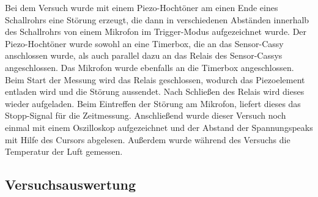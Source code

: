 \documentclass[12pt,a4paper]{article}
\begin{document}
Bei dem Versuch wurde mit einem Piezo-Hochtöner am einen Ende eines Schallrohrs eine Störung erzeugt, die dann in verschiedenen Abständen innerhalb des Schallrohrs von einem Mikrofon im Trigger-Modus aufgezeichnet wurde. Der Piezo-Hochtöner wurde sowohl an eine Timerbox, die an das Sensor-Cassy anschlossen wurde, als auch parallel dazu an das Relais des Sensor-Cassys angeschlossen. Das Mikrofon wurde ebenfalls an die Timerbox angeschlossen. Beim Start der Messung wird das Relais geschlossen, wodurch das Piezoelement entladen wird und die Störung aussendet. Nach Schließen des Relais wird dieses wieder aufgeladen. Beim  Eintreffen der Störung am Mikrofon, liefert dieses das Stopp-Signal für die Zeitmessung.
Anschließend wurde dieser Versuch noch einmal mit einem Oszilloskop aufgezeichnet und der Abstand der Spannungspeaks mit Hilfe des Cursors abgelesen.
Außerdem wurde während des Versuchs die Temperatur der Luft gemessen.
\newpage
\subsection{Versuchsauswertung}
\end{document}
